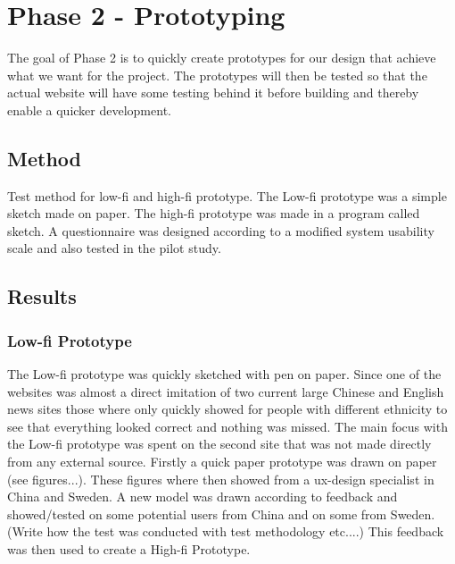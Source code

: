 
\chapter{Phase 2 - Prototyping} %

\label{Chapter5} %

The goal of Phase 2 is to quickly create prototypes for our design that achieve what we want for the project. The prototypes will then be tested so that the actual website will have some testing behind it before building and thereby enable a quicker development.

\section{Method}
Test method for low-fi and high-fi prototype. The Low-fi prototype was a simple sketch made on paper. The high-fi prototype was made in a program called sketch. A questionnaire was designed according to a modified system usability scale and also tested in the pilot study. 


\section{Results}
\subsection{Low-fi Prototype}
The Low-fi prototype was quickly sketched with pen on paper. Since one of the websites was almost a direct imitation of two current large Chinese and English news sites those where only quickly showed for people with different ethnicity to see that everything looked correct and nothing was missed. The main focus with the Low-fi prototype was spent on the second site that was not made directly from any external source. Firstly a quick paper prototype was drawn on paper  (see figures...). These figures where then showed from a ux-design specialist in China and Sweden. A new model was drawn according to feedback and showed/tested on some potential users from China and on some from Sweden. (Write how the test was conducted with test methodology etc....) This feedback was then used to create a High-fi Prototype.

